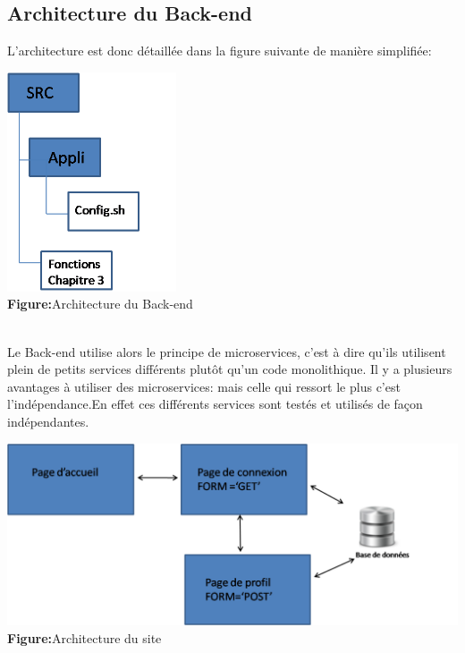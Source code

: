  \subsection{Architecture du Back-end}
 L'architecture est donc détaillée dans la figure suivante de manière simplifiée:
   \begin{center}
         \includegraphics[width=5cm]{backendarch.png}\\
         \textbf{Figure:}Architecture du Back-end
         \end{center}\\
    Le Back-end utilise alors le principe de microservices, c'est à dire qu'ils utilisent plein de petits services différents plutôt qu'un code monolithique. Il y a plusieurs avantages à utiliser des microservices: mais celle qui ressort le plus c'est l'indépendance.En effet ces différents services sont testés et utilisés de façon indépendantes.
    
      \begin{center}
         \includegraphics[width=15cm]{schsite.png}\\
         \textbf{Figure:}Architecture du site
         \end{center}\\